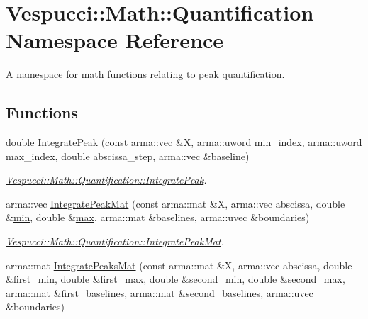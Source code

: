 \hypertarget{namespace_vespucci_1_1_math_1_1_quantification}{\section{Vespucci\+:\+:Math\+:\+:Quantification Namespace Reference}
\label{namespace_vespucci_1_1_math_1_1_quantification}
}


A namespace for math functions relating to peak quantification.  


\subsection*{Functions}
\begin{DoxyCompactItemize}
\item 
double \hyperlink{namespace_vespucci_1_1_math_1_1_quantification_ad7bdec1b7cc7351cc6c4c5db0c28f069}{Integrate\+Peak} (const arma\+::vec \&X, arma\+::uword min\+\_\+index, arma\+::uword max\+\_\+index, double abscissa\+\_\+step, arma\+::vec \&baseline)
\begin{DoxyCompactList}\small\item\em \hyperlink{namespace_vespucci_1_1_math_1_1_quantification_ad7bdec1b7cc7351cc6c4c5db0c28f069}{Vespucci\+::\+Math\+::\+Quantification\+::\+Integrate\+Peak}. \end{DoxyCompactList}\item 
arma\+::vec \hyperlink{namespace_vespucci_1_1_math_1_1_quantification_a6bc1dd68cd6d9aa6c86d1b57c975f1aa}{Integrate\+Peak\+Mat} (const arma\+::mat \&X, arma\+::vec abscissa, double \&\hyperlink{namespace_vespucci_1_1_math_a884dc00603c6aed8e2ee23988c429c64}{min}, double \&\hyperlink{namespace_vespucci_1_1_math_a3d8f536b4465a4bacce89a51e3854daf}{max}, arma\+::mat \&baselines, arma\+::uvec \&boundaries)
\begin{DoxyCompactList}\small\item\em \hyperlink{namespace_vespucci_1_1_math_1_1_quantification_a6bc1dd68cd6d9aa6c86d1b57c975f1aa}{Vespucci\+::\+Math\+::\+Quantification\+::\+Integrate\+Peak\+Mat}. \end{DoxyCompactList}\item 
arma\+::mat \hyperlink{namespace_vespucci_1_1_math_1_1_quantification_a69e656fff0fae8013961de06b6ff72cc}{Integrate\+Peaks\+Mat} (const arma\+::mat \&X, arma\+::vec abscissa, double \&first\+\_\+min, double \&first\+\_\+max, double \&second\+\_\+min, double \&second\+\_\+max, arma\+::mat \&first\+\_\+baselines, arma\+::mat \&second\+\_\+baselines, arma\+::uvec \&boundaries)

\end{DoxyCompactItemize}
